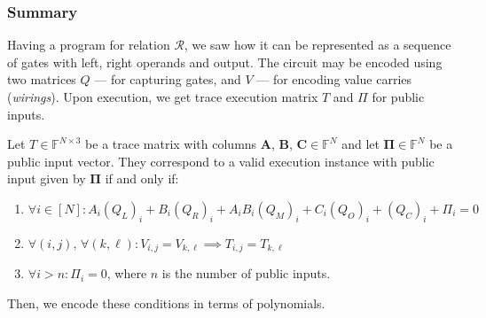 \documentclass[../lecture-notes.tex]{subfiles}
\begin{document}
\subsubsection{Summary}
Having a program for relation $\mathcal{R}$, we saw how it can be represented as
a sequence of gates with left, right operands and output. The circuit may be
encoded using two matrices $Q$ --- for capturing gates, and $V$ --- for encoding
value carries (\textit{wirings}). Upon execution, we get trace execution matrix
$T$ and $\Pi$ for public inputs.

\begin{definition}
Let $T \in \mathbb{F}^{N \times 3}$ be a trace matrix with columns $\mathbf{A}$,
$\mathbf{B}$, $\mathbf{C} \in \mathbb{F}^N$ and let $\boldsymbol{\Pi} \in
\mathbb{F}^N$ be a public input vector. They correspond to a valid execution
instance with public input given by $\boldsymbol{\Pi}$ if and only if:
\begin{enumerate}
    \item \(\forall i \in [N]: A_i(Q_{L})_i + B_i(Q_{R})_i + A_iB_i(Q_{M})_i + C_i(Q_{O})_i + (Q_{C})_i + \Pi_i = 0\)
    \item \(\forall (i, j), \, \forall (k, \ell): V_{i,j} = V_{k,\ell} \implies T_{i,j} = T_{k,\ell}\)
    \item \(\forall i > n: \Pi_i = 0\), where $n$ is the number of public inputs.
\end{enumerate}
\end{definition}

Then, we encode these conditions in terms of polynomials.
\end{document}
